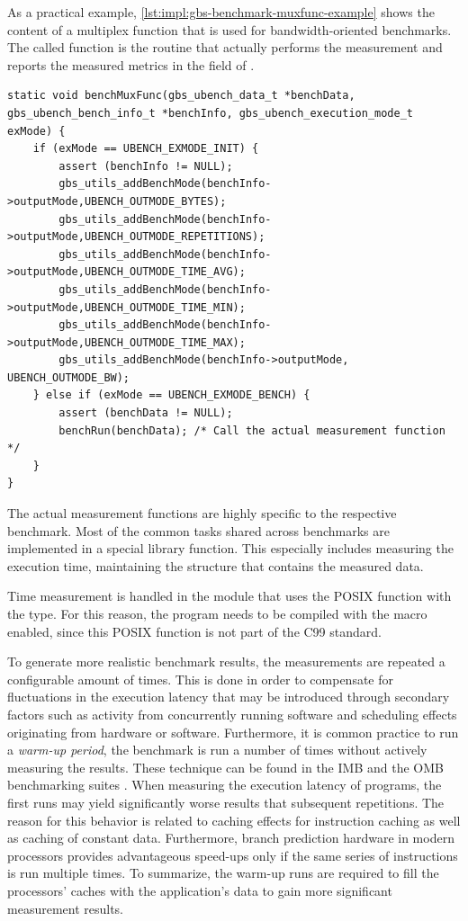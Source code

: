 As a practical example, \autoref{lst:impl:gbs-benchmark-muxfunc-example} shows the content of a multiplex function that is used for bandwidth-oriented benchmarks. The called function  is the routine that actually performs the measurement and reports the measured metrics in the  field of \ubenchData.

\begin{lstlisting}[style=cpp,captionpos={b},caption={Example of a standard multiplex function for transfer size related benchmarks.},label=lst:impl:gbs-benchmark-muxfunc-example]
static void benchMuxFunc(gbs_ubench_data_t *benchData, gbs_ubench_bench_info_t *benchInfo, gbs_ubench_execution_mode_t exMode) {
	if (exMode == UBENCH_EXMODE_INIT) {
		assert (benchInfo != NULL);
		gbs_utils_addBenchMode(benchInfo->outputMode,UBENCH_OUTMODE_BYTES);
		gbs_utils_addBenchMode(benchInfo->outputMode,UBENCH_OUTMODE_REPETITIONS);
		gbs_utils_addBenchMode(benchInfo->outputMode,UBENCH_OUTMODE_TIME_AVG);
		gbs_utils_addBenchMode(benchInfo->outputMode,UBENCH_OUTMODE_TIME_MIN);
		gbs_utils_addBenchMode(benchInfo->outputMode,UBENCH_OUTMODE_TIME_MAX);
		gbs_utils_addBenchMode(benchInfo->outputMode,   UBENCH_OUTMODE_BW);
	} else if (exMode == UBENCH_EXMODE_BENCH) {
		assert (benchData != NULL);
		benchRun(benchData); /* Call the actual measurement function */
	}
}
\end{lstlisting}

The actual measurement functions are highly specific to the respective benchmark. Most of the common tasks shared across benchmarks are implemented in a special library function. This especially includes measuring the execution time, maintaining the structure \ubenchResult that contains the measured data. 

Time measurement is handled in the module  that uses the \acs{POSIX} function  with the  type. For this reason, the program needs to be compiled with the macro \macroPosix enabled, since this \acs{POSIX} function is not part of the C99 standard.

To generate more realistic benchmark results, the measurements are repeated a configurable amount of times. This is done in order to compensate for fluctuations in the execution latency that may be introduced through secondary factors such as activity from concurrently running software and scheduling effects originating from hardware or software. Furthermore, it is common practice to run a \emph{warm-up period}, \ie the benchmark is run a number of times without actively measuring the results. These technique can be found in the \ac{IMB} and the \ac{OMB} benchmarking suites \cite{imb,omb}. When measuring the execution latency of programs, the first runs may yield significantly worse results that subsequent repetitions. The reason for this behavior is related to caching effects for instruction caching as well as caching of constant data. Furthermore, branch prediction hardware in modern processors provides advantageous speed-ups only if the same series of instructions is run multiple times. To summarize, the warm-up runs are required to fill the processors' caches with the application's data to gain more significant measurement results.

